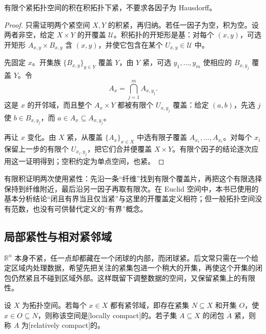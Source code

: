 \begin{proposition}\label{g1:prop:finite-product-compact}
	有限个紧拓扑空间的积在积拓扑下紧，不要求各因子为 Hausdorff。
\end{proposition}
\begin{proof}
	只需证明两个紧空间 \(X,Y\) 的积紧，再归纳。若任一因子为空，积为空。设两者非空，给定 \(X\times Y\) 的开覆盖 \(\mathcal U\)。积拓扑的开矩形是基：对每个 \((x,y)\)，可选开矩形 \(A_{x,y}\times B_{x,y}\) 含 \((x,y)\)，并使它包含在某个 \(U_{x,y}\in\mathcal U\) 中。

	先固定 \(x\)。开集族 \(\{B_{x,y}\}_{y\in Y}\) 覆盖 \(Y\)，由 \(Y\) 紧，可选 \(y_1,\ldots,y_m\) 使相应的 \(B_{x,y_j}\) 覆盖 \(Y\)。令
	\[
		A_x=\bigcap_{j=1}^m A_{x,y_j}.
	\]
	这是 \(x\) 的开邻域，而且整个 \(A_x\times Y\) 都被有限个 \(U_{x,y_j}\) 覆盖：给定 \((a,b)\)，先选 \(j\) 使 \(b\in B_{x,y_j}\)，而 \(a\in A_x\subseteq A_{x,y_j}\)。

	再让 \(x\) 变化。由 \(X\) 紧，从覆盖 \(\{A_x\}_{x\in X}\) 中选有限子覆盖 \(A_{x_1},\ldots,A_{x_r}\)。对每个 \(x_i\) 保留上一步的有限个 \(U_{x_i,y_j}\)，把它们合并便覆盖 \(X\times Y\)。有限个因子的结论逐次应用这一证明得到；空积约定为单点空间，也紧。
\end{proof}

有限积证明两次使用紧性：先沿一条“纤维”找到有限个覆盖片，再把这个有限选择保持到纤维附近，最后沿另一因子再取有限次。在 Euclid 空间中，本书已使用的基本分析结论“闭且有界当且仅当紧”与这里的开覆盖定义相符；但一般拓扑空间没有范数，也没有可供替代定义的“有界”概念。

\subsection{局部紧性与相对紧邻域}
\label{g1:subsec:0402:02}

\(\mathbb R^n\) 本身不紧，任一点却都藏在一个闭球的内部，而闭球紧。后文常只需在一个给定区域内处理数据，希望先把关注的紧集包进一个稍大的开集，再使这个开集的闭包仍然紧且不碰到区域外部。这样既留下调整数据的空间，又保留紧集上的有限性。

\begin{definition}\label{g1:def:locally-compact}
	设 \(X\) 为拓扑空间。若每个 \(x\in X\) 都有紧邻域，即存在紧集 \(N\subseteq X\) 和开集 \(O\)，使 \(x\in O\subseteq N\)，则称该空间是[locally compact]的。若子集 \(A\subseteq X\) 的闭包 \(\overline A\) 紧，则称 \(A\) 为[relatively compact]的。
\end{definition}

